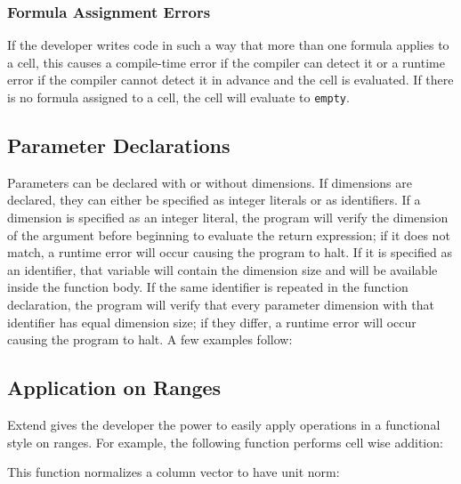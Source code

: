\subsubsection{Formula Assignment Errors}
If the developer writes code in such a way that more than one formula applies to a cell, this causes a compile-time error if the compiler can detect it or a runtime error if the compiler cannot detect it in advance and the cell is evaluated. If there is no formula assigned to a cell, the cell will evaluate to \texttt{empty}.
\subsection{Parameter Declarations}
Parameters can be declared with or without dimensions. If dimensions are declared, they can either be specified as integer literals or as identifiers. If a dimension is specified as an integer literal, the program will verify the dimension of the argument before beginning to evaluate the return expression; if it does not match, a runtime error will occur causing the program to halt. If it is specified as an identifier, that variable will contain the dimension size and will be available inside the function body. If the same identifier is repeated in the function declaration, the program will verify that every parameter dimension with that identifier has equal dimension size; if they differ, a runtime error will occur causing the program to halt. A few examples follow:

\subsection{Application on Ranges}
Extend gives the developer the power to easily apply operations in a functional style on ranges. For example, the following function performs cell wise addition:

This function normalizes a column vector to have unit norm:

